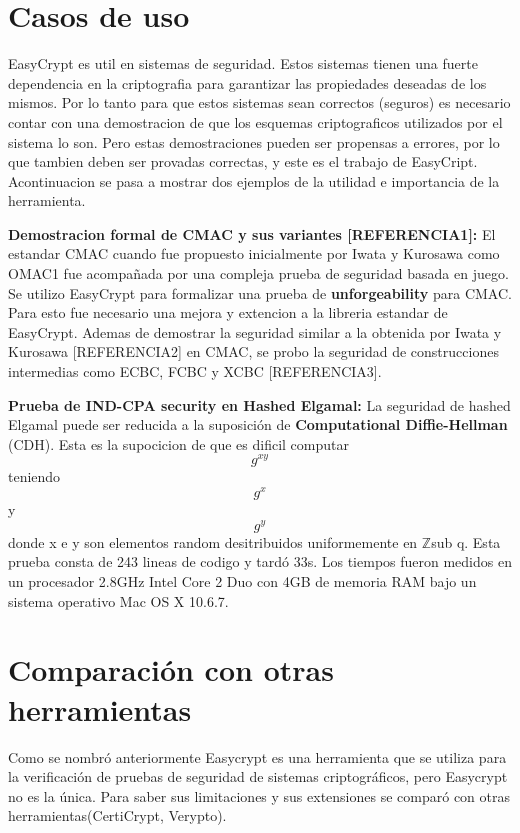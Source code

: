 \documentclass[runningheads]{llncs}
\begin{document}
\section{Casos de uso}
EasyCrypt es util en sistemas de seguridad. Estos sistemas tienen una fuerte dependencia en la criptografia para garantizar las propiedades deseadas de los mismos. Por lo tanto para que estos sistemas sean correctos (seguros) es necesario contar con una demostracion de que los esquemas criptograficos utilizados por el sistema lo son. Pero estas demostraciones pueden ser propensas a errores, por lo que tambien deben ser provadas correctas, y este es el trabajo de EasyCript. Acontinuacion se pasa a mostrar dos ejemplos de la utilidad e importancia de la herramienta.

\textbf{Demostracion formal de CMAC y sus variantes [REFERENCIA1]:}
El estandar CMAC cuando fue propuesto inicialmente por Iwata y Kurosawa como OMAC1 fue acompañada por una compleja prueba de seguridad basada en juego. Se utilizo EasyCrypt para formalizar una prueba de \textbf{unforgeability} para CMAC. Para esto fue necesario una mejora y extencion a la libreria estandar de EasyCrypt. Ademas de demostrar la seguridad similar a la obtenida por Iwata y Kurosawa [REFERENCIA2] en CMAC, se probo la seguridad de construcciones intermedias como ECBC, FCBC y XCBC [REFERENCIA3].

\textbf{Prueba de \textbf{IND-CPA security} en Hashed Elgamal:}
La seguridad de hashed Elgamal puede ser reducida a la suposición de \textbf{Computational Diffie-Hellman} (CDH). Esta es la supocicion de que es dificil computar \begin{equation} g^{xy} \end{equation} teniendo \begin{equation} g^{x} \end{equation} y \begin{equation} g^{y} \end{equation} donde x e y son elementos random desitribuidos uniformemente  en $\mathbb{Z}$sub q. Esta prueba consta de 243 lineas de codigo y tardó 33s. Los tiempos fueron medidos en un procesador 2.8GHz Intel Core 2 Duo con 4GB de memoria RAM bajo un sistema operativo Mac OS X 10.6.7.
\section{Comparación con otras herramientas}
Como se nombró anteriormente Easycrypt es una herramienta que se utiliza para la verificación de pruebas de seguridad de sistemas criptográficos, pero Easycrypt no es la única. Para saber sus limitaciones y sus extensiones se comparó con otras herramientas(CertiCrypt, Verypto).
\end{document}
